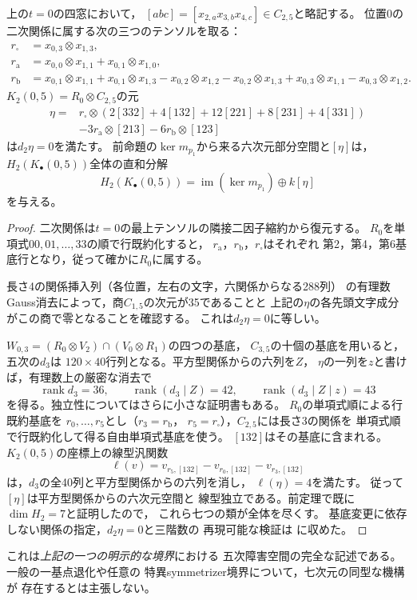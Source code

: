 \begin{proposition}[七次元の五次Koszul障害の明示的な生成]\label{prop:boundary-complete-quintic-cycles}
上の$t=0$の四窓において，
$[abc]=[x_{2,a}x_{3,b}x_{4,c}]\in C_{2,5}$と略記する。
位置0の二次関係に属する次の三つのテンソルを取る：
\[
\begin{aligned}
r_{\square}&=x_{0,3}\otimes x_{1,3},\\
r_{\mathrm a}&=x_{0,0}\otimes x_{1,1}
                  +x_{0,1}\otimes x_{1,0},\\
r_{\mathrm b}&=x_{0,1}\otimes x_{1,1}
 +x_{0,1}\otimes x_{1,3}
 -x_{0,2}\otimes x_{1,2}
 -x_{0,2}\otimes x_{1,3}
 +x_{0,3}\otimes x_{1,1}
 -x_{0,3}\otimes x_{1,2}.
\end{aligned}
\]
$K_2(0,5)=R_0\otimes C_{2,5}$の元
\[
\begin{aligned}
\eta={}&r_{\square}\otimes
 (2[332]+4[132]+12[221]+8[231]+4[331])\\
 &-3r_{\mathrm a}\otimes[213]
 -6r_{\mathrm b}\otimes[123]
\end{aligned}
\]
は$d_2\eta=0$を満たす。
前命題の$\ker m_{p_1}$から来る六次元部分空間と$[\eta]$は，
$H_2(K_\bullet(0,5))$全体の直和分解
\[
 H_2(K_\bullet(0,5))
  =\operatorname{im}(\ker m_{p_1})
   \oplus k[\eta]
\]
を与える。
\end{proposition}
\begin{proof}
二次関係は$t=0$の最上テンソルの隣接二因子縮約から復元する。
$R_0$を単項式$00,01,\ldots,33$の順で行既約化すると，
$r_{\mathrm a}$，$r_{\mathrm b}$，$r_{\square}$はそれぞれ
第2，第4，第6基底行となり，従って確かに$R_0$に属する。

長さ4の関係挿入列（各位置，左右の文字，六関係からなる288列）
の有理数Gauss消去によって，商$C_{1,5}$の次元が35であることと
上記の$\eta$の各先頭文字成分がこの商で零となることを確認する。
これは$d_2\eta=0$に等しい。

$W_{0,3}=(R_0\otimes V_2)\cap(V_0\otimes R_1)$の四つの基底，
$C_{3,5}$の十個の基底を用いると，五次の$d_3$は
$120\times40$行列となる。平方型関係からの六列を$Z$，
$\eta$の一列を$z$と書けば，有理数上の厳密な消去で
\[
 \operatorname{rank}d_3=36,\qquad
 \operatorname{rank}(d_3\mid Z)=42,\qquad
 \operatorname{rank}(d_3\mid Z\mid z)=43
\]
を得る。独立性についてはさらに小さな証明書もある。
$R_0$の単項式順による行既約基底を
$r_0,\ldots,r_5$とし（$r_3=r_{\mathrm b}$，
$r_5=r_{\square}$），$C_{2,5}$には長さ3の関係を
単項式順で行既約化して得る自由単項式基底を使う。
$[132]$はその基底に含まれる。
$K_2(0,5)$の座標上の線型汎関数
\[
 \ell(v)=v_{r_5,[132]}-v_{r_0,[132]}-v_{r_3,[132]}
\]
は，$d_3$の全40列と平方型関係からの六列を消し，
$\ell(\eta)=4$を満たす。
従って$[\eta]$は平方型関係からの六次元空間と
線型独立である。前定理で既に$\dim H_2=7$と証明したので，
これら七つの類が全体を尽くす。
基底変更に依存しない関係の指定，$d_2\eta=0$と三階数の
再現可能な検証は
に収めた。
\end{proof}

\begin{remark}
これは\emph{上記の一つの明示的な境界}における
五次障害空間の完全な記述である。一般の一基点退化や任意の
特異symmetrizer境界について，七次元の同型な機構が
存在するとは主張しない。
\end{remark}
